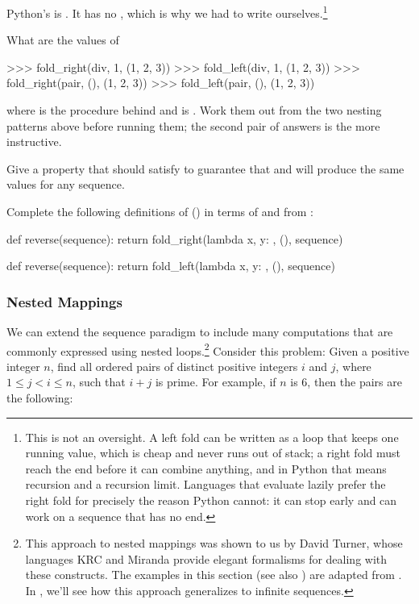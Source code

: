 \begin{exerciseGroup}
Python's  is .  It has no ,
which is why we had to write  ourselves.\footnote{This is not
an oversight.  A left fold can be written as a loop that keeps one running
value, which is cheap and never runs out of stack; a right fold must reach the
end before it can combine anything, and in Python that means recursion and a
recursion limit.  Languages that evaluate lazily prefer the right fold for
precisely the reason Python cannot: it can stop early and can work on a
sequence that has no end.}

What are the values of

\begin{codeBlock}
>>> fold_right(div, 1, (1, 2, 3))
>>> fold_left(div, 1, (1, 2, 3))
>>> fold_right(pair, (), (1, 2, 3))
>>> fold_left(pair, (), (1, 2, 3))
\end{codeBlock}

\noindent
where  is the procedure behind \code{/} and  is
.  Work them out from the two nesting patterns above
before running them; the second pair of answers is the more instructive.

Give a property that  should satisfy to guarantee that
 and  will produce the same values for any
sequence.

\label{Exercise 2.39}
 Complete the following
definitions of  () in terms of
 and  from :

\begin{syntaxForm}
def reverse(sequence):
    return fold_right(lambda x, y: , (), sequence)

def reverse(sequence):
    return fold_left(lambda x, y: , (), sequence)
\end{syntaxForm}
\end{exerciseGroup}

\subsubsection*{Nested Mappings}

We can extend the sequence paradigm to include many computations that are
commonly expressed using nested loops.\footnote{This approach to nested
mappings was shown to us by David Turner, whose languages KRC and Miranda
provide elegant formalisms for dealing with these constructs.  The examples in
this section (see also ) are adapted from .  In , we'll see how this approach generalizes to
infinite sequences.} Consider this problem: Given a positive integer \( n \),
find all ordered pairs of distinct positive integers \( i \) and \( j \), where
\( 1 \le j < i \le n \), such that \( i + j \) is prime.  For example, if \( n
\) is 6, then the pairs are the following:

